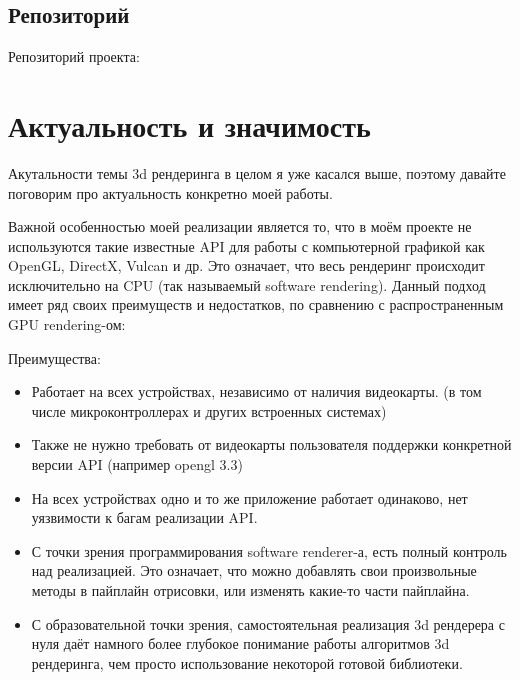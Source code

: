\documentclass[12pt]{article}
\begin{document}
\subsection {Репозиторий}
Репозиторий проекта: ~\cite{3dRenderer}


\section{Актуальность и значимость}


Акутальности темы 3d рендеринга в целом я уже касался выше, поэтому давайте поговорим про актуальность конкретно моей работы.

Важной особенностью моей реализации является то, что в моём проекте не используются такие известные API для работы с компьютерной графикой как OpenGL, DirectX, Vulcan и др. Это означает, что весь рендеринг происходит исключительно на CPU (так называемый software rendering). Данный подход имеет ряд своих преимуществ и недостатков, по сравнению с распространенным GPU rendering-ом:

Преимущества:
\begin{itemize}
	\item Работает на всех устройствах, независимо от наличия видеокарты. (в том числе микроконтроллерах и других встроенных системах)
	\item Также не нужно требовать от видеокарты пользователя поддержки конкретной версии API (например opengl 3.3)
	\item На всех устройствах одно и то же приложение работает одинаково, нет уязвимости к багам реализации API.
	\item С точки зрения программирования software renderer-а, есть полный контроль над реализацией. Это означает, что можно добавлять свои произвольные методы в пайплайн отрисовки, или изменять какие-то части пайплайна. 
	\item С образовательной точки зрения, самостоятельная реализация 3d рендерера с нуля даёт намного более глубокое понимание работы алгоритмов 3d рендеринга, чем просто использование некоторой готовой библиотеки.
\end{itemize}
\end{document}
